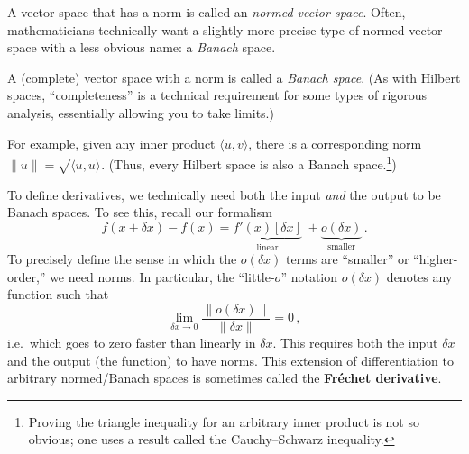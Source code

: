 A vector space that has a norm is called an \textit{normed vector space}.  Often, mathematicians technically want a slightly more precise type of normed vector space with a less obvious name: a \textit{Banach} space.

\begin{definition}
    A (complete) vector space with a norm is called a \textit{Banach space}.   (As with Hilbert spaces, ``completeness'' is a technical requirement for some types of rigorous analysis, essentially allowing you to take limits.)

  
\end{definition}

For example, given any inner product $\langle u , v \rangle$, there is a corresponding norm $\lVert u \rVert = \sqrt{\langle u , u \rangle}$.   (Thus, every Hilbert space is also a Banach space.\footnote{Proving the triangle inequality for an arbitrary inner product is not so obvious; one uses a result called the Cauchy--Schwarz inequality.})

To define derivatives, we technically need both the input \textit{and} the output to be Banach spaces. To see this, recall our formalism 
\[
f(x + \delta x) - f(x) = \underbrace{f'(x) [\delta x]}_{\mbox{linear}} \; + \underbrace{o(\delta x)}_{\mbox{smaller}}\, .
\]
To precisely define the sense in which the $o(\delta x)$ terms are ``smaller'' or ``higher-order,'' we need norms. In particular, the ``little-$o$'' notation $o(\delta x)$ denotes any function such that 
\[
\lim_{\delta x\to 0} \frac{\lVert o (\delta x) \rVert}{\lVert \delta x\rVert} = 0 \, ,
\]
i.e.~which goes to zero faster than linearly in $\delta x$.
This requires both the input $\delta x$ and the output (the function) to have norms.  This extension of differentiation to arbitrary normed/Banach spaces is sometimes called the \textbf{Fr{\'e}chet derivative}.